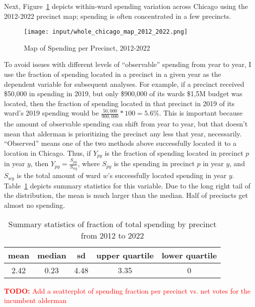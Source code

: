 Next, Figure~\ref{fig:spending_map} depicts within-ward spending variation across Chicago using the 2012-2022 precinct map; spending is often concentrated in a few precincts.

\begin{figure}[H]
    \centering
    \texttt{[image: input/whole\_chicago\_map\_2012\_2022.png]}
    \caption{Map of Spending per Precinct, 2012-2022}
    \label{fig:spending_map}
\end{figure}

To avoid issues with different levels of ``observable'' spending from year to year, I use the fraction of spending located in a precinct in a given year as the dependent variable for subsequent analyses.
For example, if a precinct received \$50,000 in spending in 2019, but only \$900,000 of its wards \$1,5M budget was located, then the fraction of spending located in that precinct in 2019 of its ward's 2019 spending would be $\frac{50,000}{900,000}*100 =5.6\%$.
This is important because the amount of observable spending can shift from year to year, but that doesn't mean that alderman is prioritizing the precinct any less that year, necessarily.
``Observed'' means one of the two methods above successfully located it to a location in Chicago.
Thus, if $Y_{py}$ is the fraction of spending located in precinct $p$ in year $y$, then $Y_{py} = \frac{S_{py}}{S_{wy}}$, where $S_{py}$ is the spending in precinct $p$ in year $y$, and $S_{wy}$ is the total amount of ward $w$'s successfully located spending in year $y$.
Table~\ref{summary_stats} depicts summary statistics for this variable.
Due to the long right tail of the distribution, the mean is much larger than the median.
Half of precincts get almost no spending.

\begin{table}[H]
\caption{Summary statistics of fraction of total spending by precinct from 2012 to 2022}\label{summary_stats}
\centering
\begin{tabular}[t]{ccccc}
\toprule
mean & median & sd & upper quartile & lower quartile\\
\midrule
2.42 & 0.23 & 4.48 & 3.35 & 0\\
\bottomrule
\end{tabular}
\end{table}

\textcolor{red}{\textbf{TODO:} Add a scatterplot of spending fraction per precinct vs. net votes for the incumbent alderman}